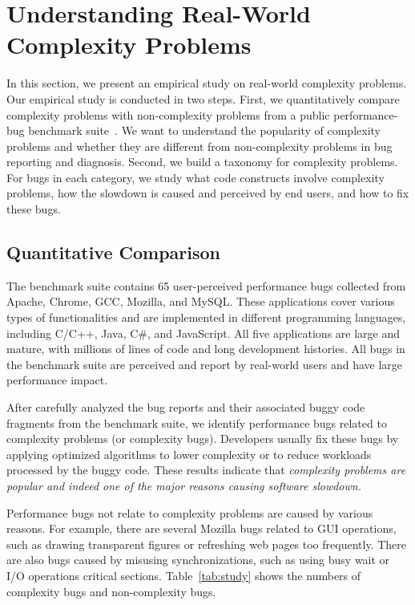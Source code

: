 \section{Understanding Real-World Complexity Problems}
\label{sec:study}



In this section, we present an empirical study on real-world 
complexity problems. Our empirical study is conducted in two steps.
First, we quantitatively compare complexity problems with non-complexity problems
from a public performance-bug benchmark suite~\cite{PerfBug,SongOOPSLA2014,ldoctor}. 
We want to understand the popularity of complexity problems 
and whether they are different from non-complexity 
problems in bug reporting and diagnosis. 
Second, we build a taxonomy for complexity problems. 
For bugs in each category, 
we study what code constructs involve complexity problems,
how the slowdown is caused and perceived by end users, 
and how to fix these bugs. 


\subsection{Quantitative Comparison}
\label{sec:compare}

The benchmark suite contains 65 user-perceived performance bugs 
collected from  Apache, Chrome, GCC, Mozilla, and MySQL. 
These applications cover various types of functionalities and are implemented 
in different programming languages, including C/C++, Java, C\#, and JavaScript. 
All  five applications are large and mature, 
with millions of lines of code and long development histories. 
All bugs in the benchmark suite are perceived and report by real-world users
and have large performance impact. 

After carefully analyzed the bug reports and their associated buggy code fragments
from the benchmark suite,
we identify \ComBugs performance bugs related to complexity problems (or complexity
bugs). 
Developers usually fix these bugs by applying optimized algorithms to lower complexity
or to reduce workloads processed by the buggy code. 
These results indicate that \emph{complexity problems are popular and 
indeed one of the major reasons causing software slowdown.}

Performance bugs not relate to complexity problems are caused by various reasons.
For example, there are several Mozilla bugs related to GUI operations, 
such as drawing transparent figures or refreshing web pages too frequently. 
There are also bugs caused by misusing synchronizations, 
such as using busy wait or I/O operations critical sections. 
Table~\ref{tab:study} shows the numbers of complexity bugs and non-complexity bugs.

